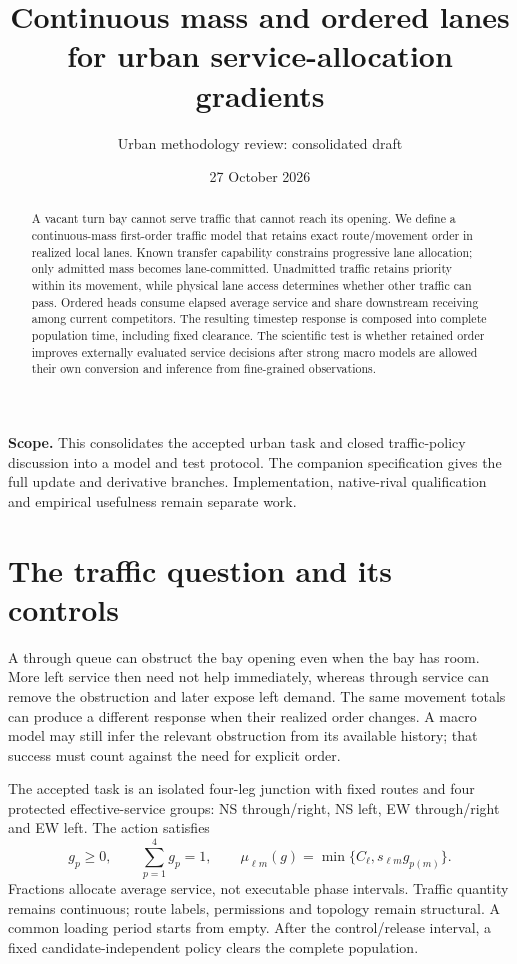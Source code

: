\documentclass[11pt,a4paper]{article}
\title{Continuous mass and ordered lanes\\for urban service-allocation gradients}
\author{Urban methodology review: consolidated draft}
\date{27 October 2026}
\begin{document}
\maketitle
\begin{abstract}
A vacant turn bay cannot serve traffic that cannot reach its opening.
We define a continuous-mass first-order traffic model that retains exact
route/movement order in realized local lanes. Known transfer capability
constrains progressive lane allocation; only admitted mass becomes
lane-committed. Unadmitted traffic retains priority within its movement,
while physical lane access determines whether other traffic can pass.
Ordered heads consume elapsed average service and share downstream
receiving among current competitors. The resulting timestep response is
composed into complete population time, including fixed clearance.
The scientific test is whether retained order improves externally
evaluated service decisions after strong macro models are allowed their
own conversion and inference from fine-grained observations.
\end{abstract}

\textbf{Scope.}
This consolidates the accepted urban task and closed traffic-policy
discussion into a model and test protocol. The companion specification
gives the full update and derivative branches. Implementation, native-rival
qualification and empirical usefulness remain separate work.

\section{The traffic question and its controls}

A through queue can obstruct the bay opening even when the bay has room.
More left service then need not help immediately, whereas through service
can remove the obstruction and later expose left demand. The same movement
totals can produce a different response when their realized order changes.
A macro model may still infer the relevant obstruction from its available
history; that success must count against the need for explicit order.

The accepted task is an isolated four-leg junction with fixed routes and
four protected effective-service groups: NS through/right, NS left,
EW through/right and EW left. The action satisfies
\begin{equation}
 g_p\geq0,\qquad \sum_{p=1}^4g_p=1,\qquad
 \mu_{\ell m}(g)=\min\{C_\ell,s_{\ell m}g_{p(m)}\}.
 \label{eq:compact-action}
\end{equation}
Fractions allocate average service, not executable phase intervals.
Traffic quantity remains continuous; route labels, permissions and topology
remain structural. A common loading period starts from empty. After the
control/release interval, a fixed candidate-independent policy clears
the complete population.
\end{document}
